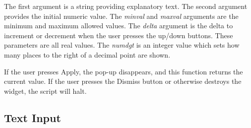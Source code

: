 \begin{description}
The first argument is a string providing explanatory text.  The
second argument provides the initial numeric value.  The
{\it minval} and {\it maxval} arguments are the minimum and
maximum allowed values.  The {\it delta} argument is the delta to
increment or decrement when the user presses the up/down buttons.
These parameters are all real values.  The {\it numdgt} is an
integer value which sets how many places to the right of a decimal
point are shown.

If the user presses {\cb Apply}, the pop-up disappears, and this
function returns the current value.  If the user presses the {\cb
Dismiss} button or otherwise destroys the widget, the script will
halt.
\end{description}


\subsection{Text Input}

